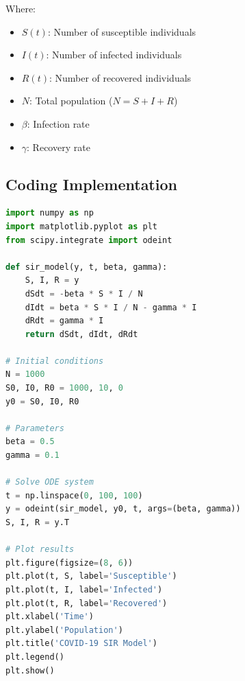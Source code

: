 \documentclass[12pt,a4paper]{article}
\begin{document}
Where:
\begin{itemize}
    \item $S(t)$: Number of susceptible individuals
    \item $I(t)$: Number of infected individuals
    \item $R(t)$: Number of recovered individuals
    \item $N$: Total population ($N = S + I + R$)
    \item $\beta$: Infection rate
    \item $\gamma$: Recovery rate
\end{itemize}
\subsection{Coding Implementation}
\begin{lstlisting}[language=Python]
import numpy as np
import matplotlib.pyplot as plt
from scipy.integrate import odeint

def sir_model(y, t, beta, gamma):
    S, I, R = y
    dSdt = -beta * S * I / N
    dIdt = beta * S * I / N - gamma * I
    dRdt = gamma * I
    return dSdt, dIdt, dRdt

# Initial conditions
N = 1000
S0, I0, R0 = 1000, 10, 0 
y0 = S0, I0, R0

# Parameters
beta = 0.5
gamma = 0.1

# Solve ODE system
t = np.linspace(0, 100, 100)
y = odeint(sir_model, y0, t, args=(beta, gamma))
S, I, R = y.T

# Plot results
plt.figure(figsize=(8, 6))
plt.plot(t, S, label='Susceptible')
plt.plot(t, I, label='Infected')
plt.plot(t, R, label='Recovered')
plt.xlabel('Time')
plt.ylabel('Population')
plt.title('COVID-19 SIR Model')
plt.legend()
plt.show()
\end{lstlisting}
\end{document}
